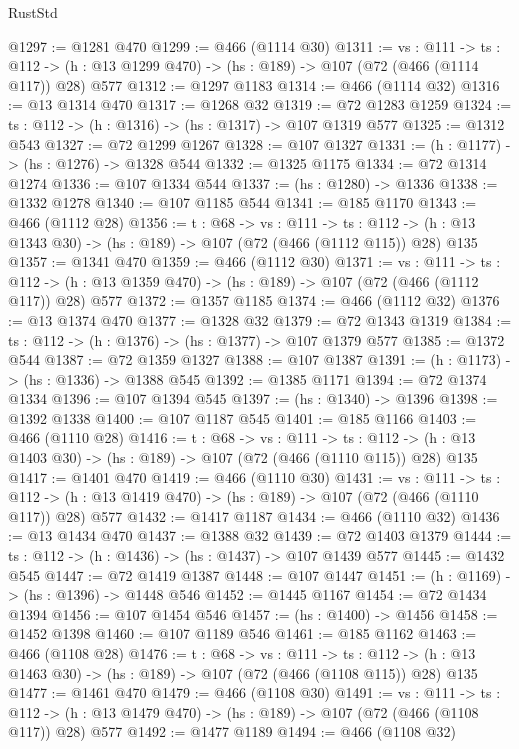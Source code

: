 \begin{lexlean}{RustStd}
\begin{coremodule}
@1297 := @1281 @470
@1299 := @466 (@1114 @30)
@1311 := {vs : @111} ->
  {ts : @112} -> (h : @13 @1299 @470) -> (hs : @189) -> @107 (@72 (@466 (@1114 @117)) @28) @577
@1312 := @1297 @1183
@1314 := @466 (@1114 @32)
@1316 := @13 @1314 @470
@1317 := @1268 @32
@1319 := @72 @1283 @1259
@1324 := {ts : @112} -> (h : @1316) -> (hs : @1317) -> @107 @1319 @577
@1325 := @1312 @543
@1327 := @72 @1299 @1267
@1328 := @107 @1327
@1331 := (h : @1177) -> (hs : @1276) -> @1328 @544
@1332 := @1325 @1175
@1334 := @72 @1314 @1274
@1336 := @107 @1334 @544
@1337 := (hs : @1280) -> @1336
@1338 := @1332 @1278
@1340 := @107 @1185 @544
@1341 := @185 @1170
@1343 := @466 (@1112 @28)
@1356 := {t : @68} ->
  {vs : @111} ->
  {ts : @112} -> (h : @13 @1343 @30) -> (hs : @189) -> @107 (@72 (@466 (@1112 @115)) @28) @135
@1357 := @1341 @470
@1359 := @466 (@1112 @30)
@1371 := {vs : @111} ->
  {ts : @112} -> (h : @13 @1359 @470) -> (hs : @189) -> @107 (@72 (@466 (@1112 @117)) @28) @577
@1372 := @1357 @1185
@1374 := @466 (@1112 @32)
@1376 := @13 @1374 @470
@1377 := @1328 @32
@1379 := @72 @1343 @1319
@1384 := {ts : @112} -> (h : @1376) -> (hs : @1377) -> @107 @1379 @577
@1385 := @1372 @544
@1387 := @72 @1359 @1327
@1388 := @107 @1387
@1391 := (h : @1173) -> (hs : @1336) -> @1388 @545
@1392 := @1385 @1171
@1394 := @72 @1374 @1334
@1396 := @107 @1394 @545
@1397 := (hs : @1340) -> @1396
@1398 := @1392 @1338
@1400 := @107 @1187 @545
@1401 := @185 @1166
@1403 := @466 (@1110 @28)
@1416 := {t : @68} ->
  {vs : @111} ->
  {ts : @112} -> (h : @13 @1403 @30) -> (hs : @189) -> @107 (@72 (@466 (@1110 @115)) @28) @135
@1417 := @1401 @470
@1419 := @466 (@1110 @30)
@1431 := {vs : @111} ->
  {ts : @112} -> (h : @13 @1419 @470) -> (hs : @189) -> @107 (@72 (@466 (@1110 @117)) @28) @577
@1432 := @1417 @1187
@1434 := @466 (@1110 @32)
@1436 := @13 @1434 @470
@1437 := @1388 @32
@1439 := @72 @1403 @1379
@1444 := {ts : @112} -> (h : @1436) -> (hs : @1437) -> @107 @1439 @577
@1445 := @1432 @545
@1447 := @72 @1419 @1387
@1448 := @107 @1447
@1451 := (h : @1169) -> (hs : @1396) -> @1448 @546
@1452 := @1445 @1167
@1454 := @72 @1434 @1394
@1456 := @107 @1454 @546
@1457 := (hs : @1400) -> @1456
@1458 := @1452 @1398
@1460 := @107 @1189 @546
@1461 := @185 @1162
@1463 := @466 (@1108 @28)
@1476 := {t : @68} ->
  {vs : @111} ->
  {ts : @112} -> (h : @13 @1463 @30) -> (hs : @189) -> @107 (@72 (@466 (@1108 @115)) @28) @135
@1477 := @1461 @470
@1479 := @466 (@1108 @30)
@1491 := {vs : @111} ->
  {ts : @112} -> (h : @13 @1479 @470) -> (hs : @189) -> @107 (@72 (@466 (@1108 @117)) @28) @577
@1492 := @1477 @1189
@1494 := @466 (@1108 @32)

\end{coremodule}
\end{lexlean}
